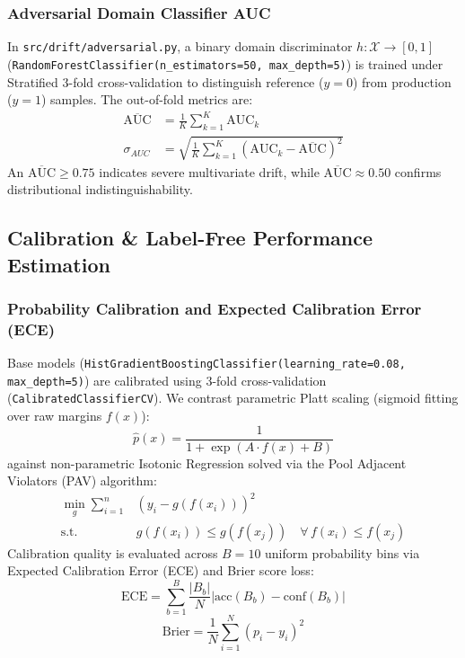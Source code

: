 \documentclass[conference]{IEEEtran}
\begin{document}
\subsubsection{Adversarial Domain Classifier AUC}
In \texttt{src/drift/adversarial.py}, a binary domain discriminator $h: \mathcal{X} \to [0, 1]$ (\texttt{RandomForestClassifier(n\_estimators=50, max\_depth=5)}) is trained under Stratified 3-fold cross-validation to distinguish reference ($y=0$) from production ($y=1$) samples. The out-of-fold metrics are:
\begin{equation}
\begin{aligned}
\overline{\text{AUC}} &= \frac{1}{K} \sum_{k=1}^K \text{AUC}_k \\
\sigma_{AUC} &= \sqrt{\frac{1}{K} \sum_{k=1}^K (\text{AUC}_k - \overline{\text{AUC}})^2}
\end{aligned}
\end{equation}
An $\overline{\text{AUC}} \ge 0.75$ indicates severe multivariate drift, while $\overline{\text{AUC}} \approx 0.50$ confirms distributional indistinguishability.

\subsection{Calibration \& Label-Free Performance Estimation}

\subsubsection{Probability Calibration and Expected Calibration Error (ECE)}
Base models (\texttt{HistGradientBoostingClassifier(learning\_rate=0.08, max\_depth=5)}) are calibrated using 3-fold cross-validation (\texttt{CalibratedClassifierCV}). We contrast parametric Platt scaling (sigmoid fitting over raw margins $f(x)$):
\begin{equation}
\hat{p}(x) = \frac{1}{1 + \exp(A \cdot f(x) + B)}
\end{equation}
against non-parametric Isotonic Regression solved via the Pool Adjacent Violators (PAV) algorithm:
\begin{equation}
\begin{aligned}
\min_g \sum_{i=1}^n &\left(y_i - g(f(x_i))\right)^2 \\
\text{s.t. } &g(f(x_i)) \le g(f(x_j)) \quad \forall\, f(x_i) \le f(x_j)
\end{aligned}
\end{equation}
Calibration quality is evaluated across $B=10$ uniform probability bins via Expected Calibration Error (ECE) and Brier score loss:
\begin{equation}
\text{ECE} = \sum_{b=1}^B \frac{|B_b|}{N} \left| \text{acc}(B_b) - \text{conf}(B_b) \right|
\end{equation}
\begin{equation}
\text{Brier} = \frac{1}{N} \sum_{i=1}^N (p_i - y_i)^2
\end{equation}
\end{document}
